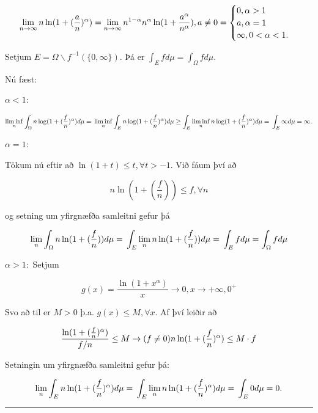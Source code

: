 \documentclass[]{book}
\begin{document}
\[
\lim_{n\rightarrow\infty}n\ln(1 + (\frac an)^\alpha) \\ =\lim_{n\rightarrow\infty}n^{1-\alpha}n^\alpha\ln(1 + \frac{a^\alpha}{n^\alpha}), a\neq 0 \\
= \begin{cases}
0, \alpha > 1\\
a, \alpha = 1 \\
\infty, 0<\alpha<1.
\end{cases}
\]

Setjum \(E = \Omega\backslash f^{-1}(\{0,\infty\})\). Þá er \(\int_E fd\mu = \int_\Omega fd\mu\).

Nú fæst:

\(\alpha < 1\):

\[
\liminf_n\int_\Omega n\log(1 + (\frac fn)^\alpha)d\mu =\\
\liminf_n \int_En\log(1+(\frac fn)^\alpha)d\mu \geq
\int_E\liminf_n n\log(1 + (\frac fn)^\alpha)d\mu = \\
\int_E\infty d \mu = \infty.
\]

\(\alpha = 1\):

Tökum nú eftir að \(\ln(1 + t) \leq t, \forall t>-1\). Við fáum því að

\[
n\ln(1 + (\frac fn)) \leq  f, \forall n
\]

og setning um yfirgnæfða samleitni gefur þá

\[
\lim_n\int_\Omega n\ln(1 + (\frac fn))d\mu = \\
\int_E \lim_n n\ln(1 + (\frac fn))d\mu = \\
\int_E fd\mu = \int_\Omega fd\mu
\]

\(\alpha>1:\) Setjum

\[
g(x) = \frac{\ln(1 + x^\alpha)}{x} \rightarrow 0, x\rightarrow +\infty, 0^+
\]

Svo að til er \(M>0\) þ.a. \(g(x) \leq M, \forall x\). Af því leiðir að

\[
\frac{\ln(1 + (\frac fn)^\alpha)}{f/n} \leq M \rightarrow (f\neq 0) \\
n\ln(1 + (\frac fn)^\alpha) \leq M\cdot f
\]

Setningin um yfirgnæfða samleitni gefur þá:

\[
\lim_n\int_E n\ln(1 + (\frac fn)^\alpha)d\mu = \\
\int_E \lim_n n\ln(1 + (\frac fn)^\alpha)d\mu = \\
\int_E 0 d\mu = 0.
\]

\begin{center}\rule{0.5\linewidth}{\linethickness}\end{center}
\end{document}
